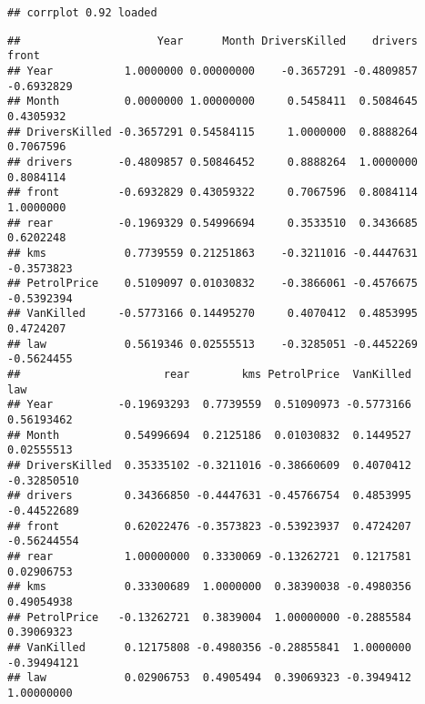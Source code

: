 \documentclass[
]{article}
\newenvironment{Shaded}{\begin{snugshade}}{\end{snugshade}}
\newcommand{\CommentTok}[1]{\textcolor[rgb]{0.56,0.35,0.01}{\textit{#1}}}
\newcommand{\FunctionTok}[1]{\textcolor[rgb]{0.00,0.00,0.00}{#1}}
\newcommand{\NormalTok}[1]{#1}
\newcommand{\OtherTok}[1]{\textcolor[rgb]{0.56,0.35,0.01}{#1}}
\newcommand{\SpecialCharTok}[1]{\textcolor[rgb]{0.00,0.00,0.00}{#1}}
\begin{document}
\begin{verbatim}
## corrplot 0.92 loaded
\end{verbatim}

\begin{Shaded}
\end{Shaded}

\begin{verbatim}
##                     Year      Month DriversKilled    drivers      front
## Year           1.0000000 0.00000000    -0.3657291 -0.4809857 -0.6932829
## Month          0.0000000 1.00000000     0.5458411  0.5084645  0.4305932
## DriversKilled -0.3657291 0.54584115     1.0000000  0.8888264  0.7067596
## drivers       -0.4809857 0.50846452     0.8888264  1.0000000  0.8084114
## front         -0.6932829 0.43059322     0.7067596  0.8084114  1.0000000
## rear          -0.1969329 0.54996694     0.3533510  0.3436685  0.6202248
## kms            0.7739559 0.21251863    -0.3211016 -0.4447631 -0.3573823
## PetrolPrice    0.5109097 0.01030832    -0.3866061 -0.4576675 -0.5392394
## VanKilled     -0.5773166 0.14495270     0.4070412  0.4853995  0.4724207
## law            0.5619346 0.02555513    -0.3285051 -0.4452269 -0.5624455
##                      rear        kms PetrolPrice  VanKilled         law
## Year          -0.19693293  0.7739559  0.51090973 -0.5773166  0.56193462
## Month          0.54996694  0.2125186  0.01030832  0.1449527  0.02555513
## DriversKilled  0.35335102 -0.3211016 -0.38660609  0.4070412 -0.32850510
## drivers        0.34366850 -0.4447631 -0.45766754  0.4853995 -0.44522689
## front          0.62022476 -0.3573823 -0.53923937  0.4724207 -0.56244554
## rear           1.00000000  0.3330069 -0.13262721  0.1217581  0.02906753
## kms            0.33300689  1.0000000  0.38390038 -0.4980356  0.49054938
## PetrolPrice   -0.13262721  0.3839004  1.00000000 -0.2885584  0.39069323
## VanKilled      0.12175808 -0.4980356 -0.28855841  1.0000000 -0.39494121
## law            0.02906753  0.4905494  0.39069323 -0.3949412  1.00000000
\end{verbatim}
\end{document}
